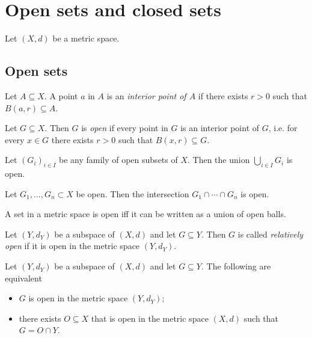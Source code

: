 \documentclass{article}
\begin{document}
\section{Open sets and closed sets}

Let $(X,d)$ be a metric space.

\subsection{Open sets}

\begin{definition}
    Let $A\subseteq X$. A point $a$ in $A$ is
    an \emph{interior point of $A$} if there exists $r>0$ such that $B(a,r)\subseteq A$.
\end{definition}

\begin{definition}
    Let $G\subseteq X$. Then $G$ is \emph{open} if 
    every point in $G$ is an interior point of $G$, i.e. for every $x\in G$ there exists 
    $r>0$ such that $B(x,r)\subseteq G$.
\end{definition}

\begin{theorem}[Notes 4.6]
    Let $(G_i)_{i\in I}$ be any family of open subsets of $X$. Then the union 
    $\bigcup_{i\in I} G_i$ is open.
\end{theorem}

\begin{theorem}[Notes 4.7]
    Let $G_1,...,G_n\subset X$ be open. Then the intersection $G_1\cap\cdots\cap G_n$
    is open. 
\end{theorem}

\begin{proposition}[Notes 4.9]
    A set in a metric space is open iff it can be written as a union of open balls. 
\end{proposition}

\begin{definition}
    Let $(Y,d_Y)$ be a subspace of $(X,d)$ and let $G\subseteq Y$. Then $G$ is called
    \emph{relatively open} if it is open in the metric space $(Y,d_Y)$.
\end{definition}

\begin{proposition}[Notes 4.10]
    Let $(Y,d_Y)$ be a subspace of $(X,d)$ and let $G\subseteq Y$. The following 
    are equivalent
    \begin{itemize}
        \item $G$ is open in the metric space $(Y,d_Y)$;
        \item there exists $O\subseteq X$ that is open in the metric space $(X,d)$ such that $G=O\cap Y$.
    \end{itemize} 
\end{proposition}
\end{document}
